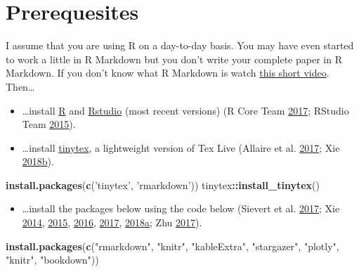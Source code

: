 \documentclass[
  12pt,
]{article}
\newenvironment{Shaded}{\begin{snugshade}}{\end{snugshade}}
\newcommand{\KeywordTok}[1]{\textcolor[rgb]{0.13,0.29,0.53}{\textbf{#1}}}
\newcommand{\NormalTok}[1]{#1}
\newcommand{\OperatorTok}[1]{\textcolor[rgb]{0.81,0.36,0.00}{\textbf{#1}}}
\newcommand{\StringTok}[1]{\textcolor[rgb]{0.31,0.60,0.02}{#1}}
\providecommand{\tightlist}{%
  \setlength{\itemsep}{0pt}\setlength{\parskip}{0pt}}
\begin{document}
\hypertarget{prerequesites}{%
\section{Prerequesites}\label{prerequesites}}

I assume that you are using R on a day-to-day basis. You may have even started to work a little in R Markdown but you don't write your complete paper in R Markdown. If you don't know what R Markdown is watch \href{https://vimeo.com/178485416}{this short video}. Then\ldots{}

\begin{itemize}
\tightlist
\item
  \ldots install \href{https://www.r-project.org/}{R} and \href{https://www.rstudio.com/}{Rstudio} (most recent versions) (R Core Team \protect\hyperlink{ref-R2017}{2017}; RStudio Team \protect\hyperlink{ref-Rstudio2015}{2015}).
\item
  \ldots install \href{https://yihui.name/tinytex/}{tinytex}, a lightweight version of Tex Live (Allaire et al. \protect\hyperlink{ref-markdown2017}{2017}; Xie \protect\hyperlink{ref-tinytex}{2018}\protect\hyperlink{ref-tinytex}{b}).
\end{itemize}

\begin{Shaded}
\begin{Highlighting}[]
\KeywordTok{install.packages}\NormalTok{(}\KeywordTok{c}\NormalTok{(}\StringTok{'tinytex'}\NormalTok{, }\StringTok{'rmarkdown'}\NormalTok{))}
\NormalTok{tinytex}\OperatorTok{::}\KeywordTok{install_tinytex}\NormalTok{()}
\end{Highlighting}
\end{Shaded}

\begin{itemize}
\tightlist
\item
  \ldots install the packages below using the code below (Sievert et al. \protect\hyperlink{ref-plotly}{2017}; Xie \protect\hyperlink{ref-knitr3}{2014}, \protect\hyperlink{ref-knitr2}{2015}, \protect\hyperlink{ref-bookdown2}{2016}, \protect\hyperlink{ref-bookdown1}{2017}, \protect\hyperlink{ref-knitr1}{2018}\protect\hyperlink{ref-knitr1}{a}; Zhu \protect\hyperlink{ref-kableextra}{2017}).
\end{itemize}

\begin{Shaded}
\begin{Highlighting}[]
\KeywordTok{install.packages}\NormalTok{(}\KeywordTok{c}\NormalTok{(}\StringTok{"rmarkdown"}\NormalTok{, }\StringTok{"knitr"}\NormalTok{, }\StringTok{"kableExtra"}\NormalTok{,}
                   \StringTok{"stargazer"}\NormalTok{, }\StringTok{"plotly"}\NormalTok{, }\StringTok{"knitr"}\NormalTok{,}
                   \StringTok{"bookdown"}\NormalTok{))}
\end{Highlighting}
\end{Shaded}
\end{document}
